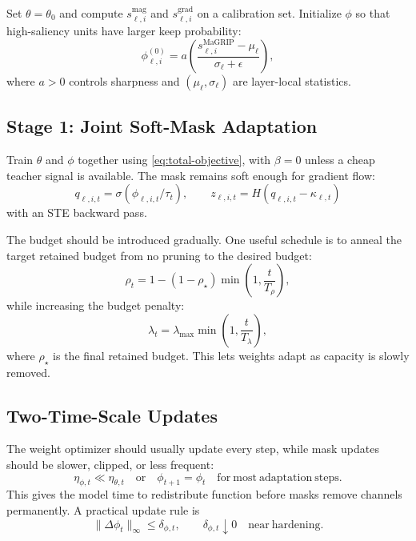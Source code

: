 \documentclass[11pt]{article}
\begin{document}
Set $\theta=\theta_0$ and compute $s_{\ell,i}^{\mathrm{mag}}$ and $s_{\ell,i}^{\mathrm{grad}}$ on a calibration set. Initialize $\phi$ so that high-saliency units have larger keep probability:
\begin{equation}
  \phi_{\ell,i}^{(0)}
  =
  a
  \left(
    \frac{s_{\ell,i}^{\mathrm{MaGRIP}}-\mu_{\ell}}{\sigma_{\ell}+\epsilon}
  \right),
\end{equation}
where $a>0$ controls sharpness and $(\mu_{\ell},\sigma_{\ell})$ are layer-local statistics.

\subsection{Stage 1: Joint Soft-Mask Adaptation}

Train $\theta$ and $\phi$ together using \eqref{eq:total-objective}, with $\beta=0$ unless a cheap teacher signal is available. The mask remains soft enough for gradient flow:
\begin{equation}
  q_{\ell,i,t}=\sigma(\phi_{\ell,i,t}/\tau_t),
  \qquad
  z_{\ell,i,t}=H(q_{\ell,i,t}-\kappa_{\ell,t})
\end{equation}
with an STE backward pass.

The budget should be introduced gradually. One useful schedule is to anneal the target retained budget from no pruning to the desired budget:
\begin{equation}
  \rho_t
  =
  1
  -
  (1-\rho_{\star})
  \min\left(1,\frac{t}{T_{\rho}}\right),
\end{equation}
while increasing the budget penalty:
\begin{equation}
  \lambda_t
  =
  \lambda_{\max}
  \min\left(1,\frac{t}{T_{\lambda}}\right),
\end{equation}
where $\rho_{\star}$ is the final retained budget. This lets weights adapt as capacity is slowly removed.

\subsection{Two-Time-Scale Updates}

The weight optimizer should usually update every step, while mask updates should be slower, clipped, or less frequent:
\begin{equation}
  \eta_{\phi,t} \ll \eta_{\theta,t}
  \quad\mathrm{or}\quad
  \phi_{t+1}=\phi_t
  \quad\mathrm{for\ most\ adaptation\ steps}.
\end{equation}
This gives the model time to redistribute function before masks remove channels permanently. A practical update rule is
\begin{equation}
  \|\Delta \phi_t\|_{\infty}
  \leq
  \delta_{\phi,t},
  \qquad
  \delta_{\phi,t}\downarrow 0
  \quad\mathrm{near\ hardening}.
\end{equation}
\end{document}
